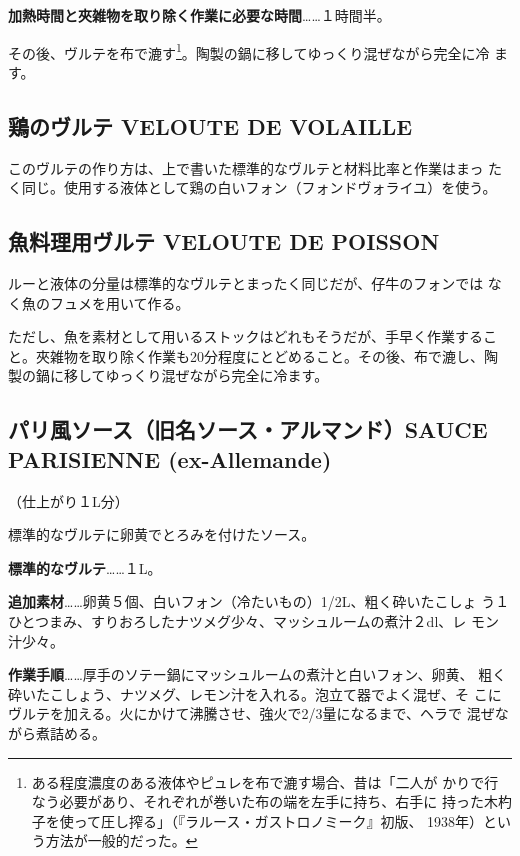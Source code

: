 \documentclass[twoside,12Q,b5paper]{escoffierltjsbook}
\begin{document}
\textbf{加熱時間と夾雑物を取り除く作業に必要な時間}\ldots{}\ldots{}１時間半。

その後、ヴルテを布で漉す\footnote{ある程度濃度のある液体やピュレを布で漉す場合、昔は「二人が
  かりで行なう必要があり、それぞれが巻いた布の端を左手に持ち、右手に
  持った木杓子を使って圧し搾る」（『ラルース・ガストロノミーク』初版、
  1938年）という方法が一般的だった。}。陶製の鍋に移してゆっくり混ぜながら完全に冷
ます。

\subsection{鶏のヴルテ VELOUTE DE
VOLAILLE}\label{ux9d8fux306eux30f4ux30ebux30c6-veloute-de-volaille}

このヴルテの作り方は、上で書いた標準的なヴルテと材料比率と作業はまっ
たく同じ。使用する液体として鶏の白いフォン（フォンドヴォライユ）を使う。

\subsection{魚料理用ヴルテ VELOUTE DE
POISSON}\label{ux9b5aux6599ux7406ux7528ux30f4ux30ebux30c6-veloute-de-poisson}

ルーと液体の分量は標準的なヴルテとまったく同じだが、仔牛のフォンでは
なく魚のフュメを用いて作る。

ただし、魚を素材として用いるストックはどれもそうだが、手早く作業するこ
と。夾雑物を取り除く作業も20分程度にとどめること。その後、布で漉し、陶
製の鍋に移してゆっくり混ぜながら完全に冷ます。

\subsection{パリ風ソース（旧名ソース・アルマンド）SAUCE PARISIENNE
(ex-Allemande)}\label{ux30d1ux30eaux98a8ux30bdux30fcux30b9ux65e7ux540dux30bdux30fcux30b9ux30a2ux30ebux30deux30f3ux30c9sauce-parisienne-ex-allemande}

（仕上がり１L分）

標準的なヴルテに卵黄でとろみを付けたソース。

\textbf{標準的なヴルテ}\ldots{}\ldots{}１L。

\textbf{追加素材}\ldots{}\ldots{}卵黄５個、白いフォン（冷たいもの）1/2L、粗く砕いたこしょ
う１ひとつまみ、すりおろしたナツメグ少々、マッシュルームの煮汁２dl、レ
モン汁少々。

\textbf{作業手順}\ldots{}\ldots{}厚手のソテー鍋にマッシュルームの煮汁と白いフォン、卵黄、
粗く砕いたこしょう、ナツメグ、レモン汁を入れる。泡立て器でよく混ぜ、そ
こにヴルテを加える。火にかけて沸騰させ、強火で2/3量になるまで、ヘラで
混ぜながら煮詰める。
\end{document}
